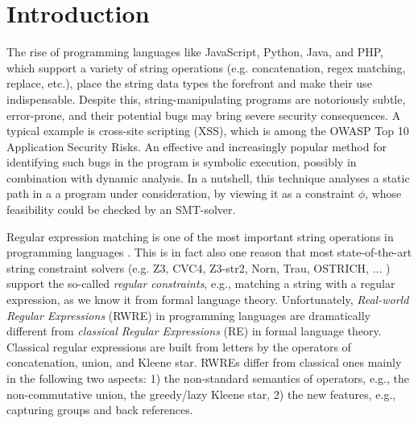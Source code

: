 
\section{Introduction}



%
The rise of programming 
languages like JavaScript, Python, Java, and PHP, which support a variety of
string operations (e.g. concatenation, regex matching, replace, etc.), place
the string data types the forefront and make their use indispensable.
Despite this,
string-manipulating programs are notoriously subtle, error-prone, and their 
potential bugs
may bring severe security consequences. A typical example is cross-site
scripting (XSS), which is among the OWASP Top 10 Application Security Risks.
An effective and increasingly popular method for identifying such bugs
in the program is symbolic execution, possibly in combination with dynamic
analysis. In a nutshell, this technique analyses a static path in a
a program under consideration, by viewing it as a constraint $\phi$, whose 
feasibility could be checked by an SMT-solver.

Regular expression matching is one of the most important string operations
in programming languages \cite{Berkeley-JavaScript,BM17,LMK19,HAMPI}.
This is in fact also one reason that most state-of-the-art string constraint solvers (e.g.
Z3, CVC4, Z3-str2, Norn, Trau, OSTRICH, ... ) support
the so-called \emph{regular constraints}, e.g., matching a string with a 
regular expression, as we know it from formal language theory. Unfortunately, 
\emph{Real-world Regular Expressions} (RWRE) in programming languages are dramatically different from 
\emph{classical Regular Expressions} (RE) in formal language theory. 
Classical regular expressions are built from letters by the operators of concatenation, union, and Kleene star. RWREs differ from classical ones mainly in the following two aspects: 1) the non-standard semantics of 
operators, e.g., the non-commutative union, the greedy/lazy Kleene star, 2) the new 
features, e.g., capturing groups and back references.

